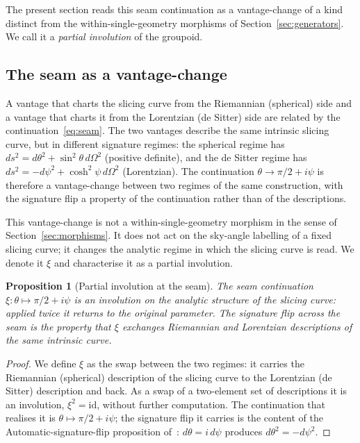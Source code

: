 \documentclass[11pt,a4paper]{article}
\newtheorem{proposition}[theorem]{Proposition}
\theoremstyle{definition}
\begin{document}
The present section reads this seam continuation as a vantage-change of a kind distinct from the within-single-geometry morphisms of Section~\ref{sec:generators}. We call it a \emph{partial involution} of the groupoid.

\subsection{The seam as a vantage-change}\label{sec:seam-vantage}

A vantage that charts the slicing curve from the Riemannian (spherical) side and a vantage that charts it from the Lorentzian (de Sitter) side are related by the continuation~\eqref{eq:seam}. The two vantages describe the same intrinsic slicing curve, but in different signature regimes: the spherical regime has $ds^{2}=d\theta^{2}+\sin^{2}\theta\, d\Omega^{2}$ (positive definite), and the de Sitter regime has $ds^{2}=-d\psi^{2}+\cosh^{2}\psi\, d\Omega^{2}$ (Lorentzian). The continuation $\theta\to\pi/2+i\psi$ is therefore a vantage-change between two regimes of the same construction, with the signature flip a property of the continuation rather than of the descriptions.

This vantage-change is not a within-single-geometry morphism in the sense of Section~\ref{sec:morphisms}. It does not act on the sky-angle labelling of a fixed slicing curve; it changes the analytic regime in which the slicing curve is read. We denote it $\xi$ and characterise it as a partial involution.

\begin{proposition}[Partial involution at the seam]\label{prop:partial}
The seam continuation $\xi:\theta\mapsto\pi/2+i\psi$ is an involution on the analytic structure of the slicing curve: applied twice it returns to the original parameter. The signature flip across the seam is the property that $\xi$ exchanges Riemannian and Lorentzian descriptions of the same intrinsic curve.
\end{proposition}

\begin{proof}
We define $\xi$ as the swap between the two regimes: it carries the Riemannian (spherical) description of the slicing curve to the Lorentzian (de Sitter) description and back. As a swap of a two-element set of descriptions it is an involution, $\xi^{2}=\text{id}$, without further computation. The continuation that realises it is $\theta\mapsto\pi/2+i\psi$; the signature flip it carries is the content of the Automatic-signature-flip proposition of~\cite{JanzenSlicing}: $d\theta=i\,d\psi$ produces $d\theta^{2}=-d\psi^{2}$.
\end{proof}
\end{document}
